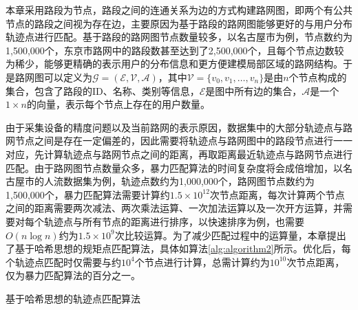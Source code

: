\documentclass[master]{thesis-uestc}
\begin{document}
本章采用路段为节点，路段之间的连通关系为边的方式构建路网图，即两个有公共节点的路段之间视为存在边，主要原因为基于路段的路网图能够更好的与用户分布轨迹点进行匹配。基于路段的路网图节点数量较多，以名古屋市为例，节点数约为1,500,000个，东京市路网中的路段数甚至达到了2,500,000个，且每个节点边数较为稀少，能够更精确的表示用户的分布信息和更方便建模局部区域的路网结构。于是路网图可以定义为$\mathcal{G}=(\mathcal{E},\mathcal{V},\mathcal{A})$，其中$\mathcal{V}=\{v_0,v_1,\dots,v_n\}$是由$n$个节点构成的集合，包含了路段的ID、名称、类别等信息，$\mathcal{E}$是图中所有边的集合，$\mathcal{A}$是一个$1\times n$的向量，表示每个节点上存在的用户数量。

由于采集设备的精度问题以及当前路网的表示原因，数据集中的大部分轨迹点与路网节点之间是存在一定偏差的，因此需要将轨迹点与路网图中的路段节点进行一一对应，先计算轨迹点与路网节点之间的距离，再取距离最近轨迹点与路网节点进行匹配。由于路网图节点数量众多，暴力匹配算法的时间复杂度将会成倍增加，以名古屋市的人流数据集为例，轨迹点数约为1,000,000个，路网图节点数约为1,500,000个，暴力匹配算法需要计算约$1.5\times 10^{12}$次节点距离，每次计算两个节点之间的距离需要两次减法、两次乘法运算、一次加法运算以及一次开方运算，并需要对每个轨迹点与所有节点的距离进行排序，以快速排序为例，也需要$O(n\log n)$约为$1.5\times 10^9$次比较运算。为了减少匹配过程中的运算量，本章提出了基于哈希思想的规矩点匹配算法，具体如算法\ref{alg:algorithm2}所示。优化后，每个轨迹点匹配时仅需要与约$10^4$个节点进行计算，总需计算约为$10^{10}$次节点距离，仅为暴力匹配算法的百分之一。
\begin{algorithm}[!ht]
\SetAlgoLined
{}
\Begin{
    初始化$\lceil(\mathcal{L}ati_{max}-\mathcal{L}ati_{min})\div \delta \rceil \times \lceil(\mathcal{L}ongi_{max}-\mathcal{L}ongi_{min})\div \delta \rceil = \Theta$个数组$\mathcal{A}rray = \{A_1,A_2,\dots,A_{\theta}\}$\\
    \While{$\tau \in  (0,n]$}{
        计算每个节点对应的数组并修改对应数组\\
        使用粒度$\delta$和最大经纬度$\mathcal{L}ati_{max},\mathcal{L}ongi_{max}$计算对应的数组编号$\theta$\\
        修改对应数组$A_{\theta}$中的值，增加对应节点信息\\
    }
    计算轨迹点坐标对应的数组编号$\theta^{\prime}$\\
    \ForEach{$(x_{\tau},y_{\tau}) \in A_{\theta^{\prime}}$}{
        计算轨迹点$(x,y)$与$(x_{\tau},y_{\tau})$的距离，在对应数组$A_{\hat{\theta}}$中保存距离值和编号$l_{\tau}$\\
    }
    对数组$A_{\hat{\theta}}$中的值进行排序\\
    输出最短距离的节点编号$\mathcal{L}$\\
}
\caption{基于哈希思想的轨迹点匹配算法}
\label{alg:algorithm2}
\end{algorithm}
\end{document}
